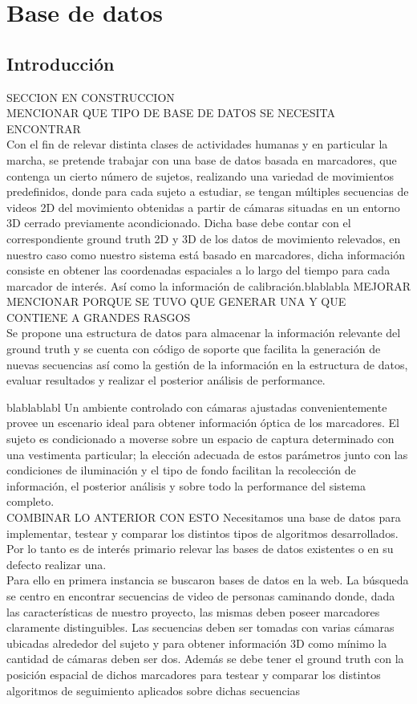 \section{Base de datos}


\subsection{Introducción} SECCION EN CONSTRUCCION\\
\label{}
MENCIONAR QUE TIPO DE BASE DE DATOS SE NECESITA ENCONTRAR\\
Con el fin de relevar distinta clases de actividades humanas y en particular la marcha, se pretende trabajar con una base de datos basada en marcadores, que contenga un cierto número de sujetos, realizando una variedad de movimientos predefinidos, donde para cada sujeto a estudiar, se tengan múltiples secuencias de videos 2D del movimiento obtenidas a partir de cámaras situadas en un entorno 3D cerrado previamente acondicionado. Dicha base debe contar con el correspondiente ground truth 2D y 3D de los datos de movimiento relevados, en nuestro caso como nuestro sistema está basado en marcadores, dicha información consiste en obtener las coordenadas espaciales a lo largo del tiempo para cada marcador de interés. Así como la información de calibración.blablabla MEJORAR \\

MENCIONAR PORQUE SE TUVO QUE GENERAR UNA Y QUE CONTIENE A GRANDES RASGOS\\
Se propone una estructura de datos para almacenar la información relevante del ground truth y  se cuenta con código de soporte que facilita la generación de nuevas secuencias así como la gestión de la información en la estructura de datos, evaluar resultados y realizar el  posterior análisis de performance.


blablablabl
Un ambiente controlado con cámaras ajustadas convenientemente provee un escenario ideal para obtener información óptica de los marcadores. El sujeto es condicionado a moverse sobre un espacio de captura determinado con una vestimenta particular; la elección adecuada de estos parámetros junto con las condiciones de iluminación y el tipo de fondo facilitan la recolección de información, el posterior análisis y sobre todo la performance del sistema completo.
\\COMBINAR LO ANTERIOR CON ESTO
Necesitamos una base de datos para implementar, testear y comparar los distintos tipos de algoritmos desarrollados. Por lo tanto es de interés primario relevar las bases de datos existentes o en su defecto realizar una.\\
Para ello en primera instancia se buscaron bases de datos en la web. La búsqueda se centro en encontrar secuencias de video de personas caminando donde, dada las características de nuestro proyecto, las mismas deben poseer marcadores claramente distinguibles. Las secuencias deben ser tomadas con varias cámaras ubicadas alrededor del sujeto y para obtener información 3D como mínimo la cantidad de cámaras deben ser dos. Además se debe tener el ground truth con la posición espacial de dichos marcadores para testear y comparar los distintos algoritmos de seguimiento aplicados sobre dichas secuencias


